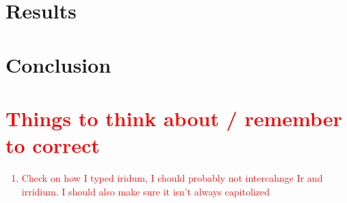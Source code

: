 \documentclass[review]{elsarticle}
\begin{document}
		

 
	\section{Results}
		
	\section{Conclusion}
	
	
	\section{\textcolor{red}{Things to think about / remember to correct}}
		\textcolor{red}{
			\begin{enumerate}
				\item Check on how I typed iridum, I chould probably not intercahnge Ir and irridium. I should also make sure it isn't always capitolized
			\end{enumerate}
		}

	
	
	
	
\end{document}
